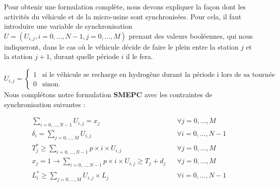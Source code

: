 Pour obtenir une formulation complète, nous devons expliquer la façon dont les activités du véhicule et de la micro-usine sont synchronisées. Pour cela, il faut introduire une variable de synchronisation $U = (U_{i,j}, i = 0, \dots, N - 1, j = 0, \dots, M)$ prenant des valeurs booléennes, qui nous indiqueront, dans le cas où le véhicule décide de faire le plein entre la station $j$ et la station $j + 1$, durant quelle période $i$ il le fera.

$$
U_{i,j}= \left\{
\begin{array}{ll}
1 & \mbox{si le véhicule se recharge en hydrogène durant la période i lors de sa tournée de j à j + 1.} \\
0 & \mbox{sinon.}
\end{array}
\right.
$$
Nous complétons notre formulation \textbf{SMEPC} avec les contraintes de synchronisation suivantes :

\begin{subequations}
	\label{synchro_veh_prod_1}
	\begin{align}
	\label{200}	\sum_{i=0, \dots, N-1} U_{i,j}=x_j	&  & \forall j= 0, \dots, M\\ %
	\label{201}	\delta_i=\sum_{j=0, \dots, M} U_{i,j} &  & \forall i= 0, \dots, N-1\\%
	\label{202}	T^*_j \geq \sum_{i=0, \dots, N-1} p \times i \times	U_{i,j} &  & \forall j= 0, \dots, M \\%
	\label{400}	x_j=1 \rightarrow \sum_{i=0, \dots, N-1} p \times i \times	U_{i,j}\geq T_j + d_j &  & \forall j= 0, \dots, M\\%
	\label{21} L^*_i \geq \sum_{j=0, \dots, M}U_{i,j} \times L_j	&  & \forall i= 0, \dots, N-1
	\end{align}
\end{subequations}


